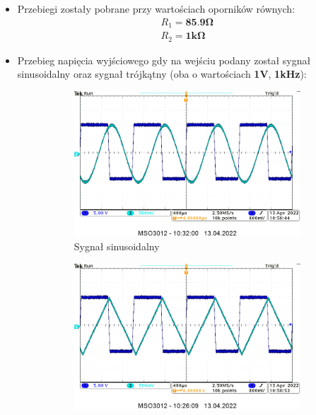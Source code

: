 \begin{itemize}
    \item Przebiegi zostały pobrane przy wartościach oporników równych:
        \begin{gather}
            \label{przerzutnik:R1} R_1 = \textbf{85.9}\boldsymbol{\Omega} \\
            \label{przerzutnik:R2} R_2 = \textbf{1k}\boldsymbol{\Omega}
        \end{gather}
    \item Przebieg napięcia wyjściowego gdy na wejściu podany został sygnał sinusoidalny oraz sygnał trójkątny (oba o wartościach \textbf{1V}, \textbf{1kHz}):
        \begin{figure}[H]
            \centering
            \begin{subfigure}[h]{0.49\textwidth}
                \includegraphics[width=\textwidth]{img/osciloscope/1_4_histereza_przeskok_sin_cropped.png}
                \caption*{Sygnał sinusoidalny}
            \end{subfigure}
            \begin{subfigure}[h]{0.49\textwidth}
                \includegraphics[width=\textwidth]{img/osciloscope/1_4_histereza_przeskok_trojkat_cropped.png}

\end{subfigure}
\end{figure}
\end{itemize}
